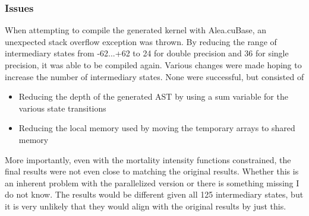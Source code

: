 \subsubsection{Issues}
When attempting to compile the generated kernel with Alea.cuBase, an unexpected stack overflow exception was thrown.
By reducing the range of intermediary states from -62...+62 to 24 for double precision and 36 for single precision, it was able to be compiled again.
Various changes were made hoping to increase the number of intermediary states.
None were successful, but consisted of
\begin{itemize}
\item Reducing the depth of the generated AST by using a sum variable for the various state transitions
\item Reducing the local memory used by moving the temporary arrays to shared memory
\end{itemize}

More importantly, even with the mortality intensity functions constrained, the final results were not even close to matching the original results.
Whether this is an inherent problem with the parallelized version or there is something missing I do not know.
The results would be different given all 125 intermediary states, but it is very unlikely that they would align with the original results by just this.